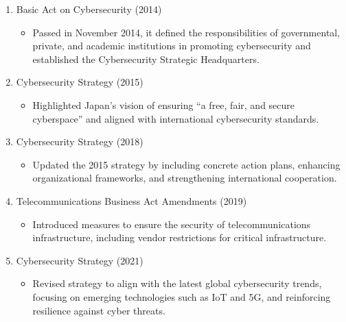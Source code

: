 \begin{enumerate}
\begin{description}
\begin{enumerate}[label=\arabic*., leftmargin=-0.5em]
\begin{itemize}
			\end{itemize}
			\item Basic Act on Cybersecurity (2014)
			\begin{itemize}
				\item Passed in November 2014, it defined the responsibilities of governmental, private, and academic institutions in promoting cybersecurity and established the Cybersecurity Strategic Headquarters.
			\end{itemize}
			\item Cybersecurity Strategy (2015)
			\begin{itemize}
				\item Highlighted Japan’s vision of ensuring “a free, fair, and secure cyberspace” and aligned with international cybersecurity standards.
			\end{itemize}
			\item Cybersecurity Strategy (2018)
			\begin{itemize}
				\item Updated the 2015 strategy by including concrete action plans, enhancing organizational frameworks, and strengthening international cooperation.
			\end{itemize}
			\item Telecommunications Business Act Amendments (2019)
			\begin{itemize}
				\item Introduced measures to ensure the security of telecommunications infrastructure, including vendor restrictions for critical infrastructure.
			\end{itemize}
			\item Cybersecurity Strategy (2021)
			\begin{itemize}
				\item Revised strategy to align with the latest global cybersecurity trends, focusing on emerging technologies such as IoT and 5G, and reinforcing resilience against cyber threats.
			\end{itemize}
        \end{enumerate}
    \end{description}


\end{enumerate}

